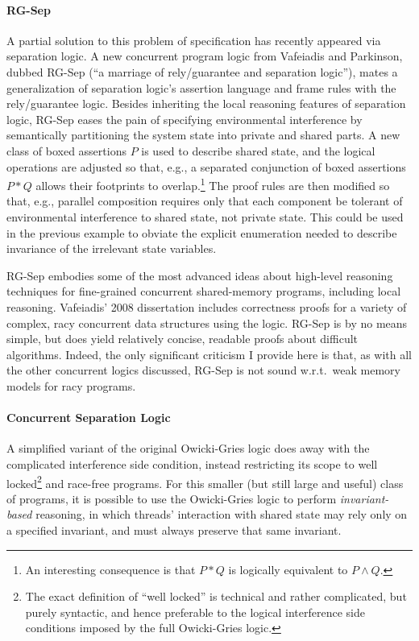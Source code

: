\documentclass[11pt]{report}
\begin{document}
\paragraph{RG-Sep} A partial solution to this problem of specification has recently appeared via separation logic. A new concurrent program logic from Vafeiadis and Parkinson, dubbed RG-Sep \cite{DBLP:conf/concur/VafeiadisP07} (``a marriage of rely/guarantee and separation logic''), mates a generalization of separation logic's assertion language and frame rules with the rely/guarantee logic. Besides inheriting the local reasoning features of separation logic, RG-Sep eases the pain of specifying environmental interference by semantically partitioning the system state into private and shared parts. A new class of boxed assertions $\boxed{P}$ is used to describe shared state, and the logical operations are adjusted so that, e.g., a separated conjunction of boxed assertions $\boxed{P} * \boxed{Q}$ allows their footprints to overlap.\footnote{An interesting consequence is that $\boxed{P} * \boxed{Q}$ is logically equivalent to $\boxed{P \wedge Q}$.} The proof rules are then modified so that, e.g., parallel composition requires only that each component be tolerant of environmental interference to shared state, not private state. This could be used in the previous example to obviate the explicit enumeration needed to describe invariance of the irrelevant state variables.

RG-Sep embodies some of the most advanced ideas about high-level reasoning techniques for fine-grained concurrent shared-memory programs, including local reasoning. Vafeiadis' 2008 dissertation \cite{VafeiadisDissertation} includes correctness proofs for a variety of complex, racy concurrent data structures using the logic. RG-Sep is by no means simple, but does yield relatively concise, readable proofs about difficult algorithms. Indeed, the only significant criticism I provide here is that, as with all the other concurrent logics discussed, RG-Sep is not sound w.r.t.~weak memory models for racy programs.

\paragraph{Concurrent Separation Logic} A simplified variant of the original Owicki-Gries logic does away with the complicated interference side condition, instead restricting its scope to well locked\footnote{The exact definition of ``well locked'' is technical and rather complicated, but purely syntactic, and hence preferable to the logical interference side conditions imposed by the full Owicki-Gries logic.} and race-free programs. For this smaller (but still large and useful) class of programs, it is possible to use the Owicki-Gries logic to perform \emph{invariant-based} reasoning, in which threads' interaction with shared state may rely only on a specified invariant, and must always preserve that same invariant.
\end{document}

